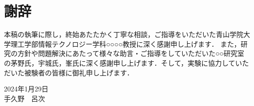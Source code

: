 \chapter*{謝辞}
本稿の執筆に際し，終始あたたかく丁寧な相談，ご指導をいただいた青山学院大学理工学部情報テクノロジー学科○○○○教授に深く感謝申し上げます．
また，研究の方針や問題解決にあたって様々な助言・ご指導をしていただいた○○研究室の茅野氏，宇城氏，峯氏に深く感謝申し上げます．そして，実験に協力していただいた被験者の皆様に御礼申し上げます．

\begin{flushright}
2024年1月29日
\\
手久野　呂次
\end{flushright}
